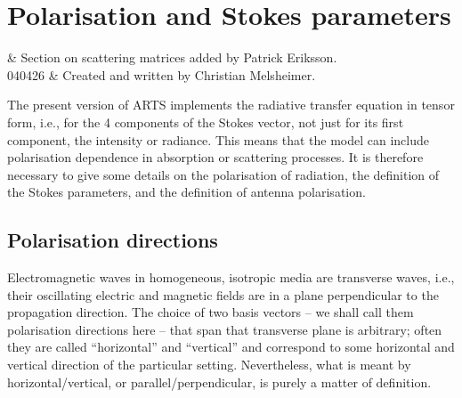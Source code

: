 \chapter{Polarisation and Stokes parameters}
 \label{sec:polarization}


 & Section on scattering matrices added by Patrick Eriksson. \\
  040426 & Created and written by Christian Melsheimer.\\
\stophistory


\graphicspath{{Figs/polarization/}}



\newcommand{\ColVct}[3]{\left( \begin{array}{c}
                                   #1 \\ #2 \\ #3
                               \end{array} \right) }
\newcommand{\PrtDrv}[2]{\frac{\partial #1}{\partial #2}}
\newcommand{\eVrt} {\ensuremath{\VctStl{e}_v}}
\newcommand{\eHor} {\ensuremath{\VctStl{e}_h}}
\newcommand{\eLh} {\ensuremath{\VctStl{e}_{LH}}}
\newcommand{\eRh} {\ensuremath{\VctStl{e}_{RH}}}
\newcommand{\ePls} {\ensuremath{\VctStl{e}_{+45\degree}}}
\newcommand{\eMin} {\ensuremath{\VctStl{e}_{-45\degree}}}
\newcommand{\mi}  {\ensuremath{\mathrm{i}}}


The present version of ARTS implements the radiative transfer equation
in tensor form, i.e., for the 4 components of the Stokes vector, not
just for its first component, the intensity or radiance.
This means that the model can include polarisation dependence in
absorption or scattering processes.
It is therefore necessary to give some details on the polarisation of
radiation, the definition of
the Stokes parameters, and the definition of antenna polarisation.


\section{Polarisation directions}
\label{sec:polarization:directions}
Electromagnetic waves in homogeneous, isotropic media are transverse
waves, i.e., their oscillating electric and magnetic fields are in a
plane perpendicular to the propagation direction. The choice of two
basis vectors -- we shall call them polarisation directions here --
that span that transverse plane is arbitrary; often they are called
``horizontal'' and ``vertical'' and correspond to some horizontal and
vertical direction of the particular setting. Nevertheless, what is
meant by horizontal/vertical, or parallel/perpendicular, is purely a
matter of definition.

